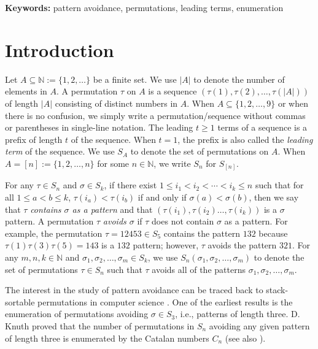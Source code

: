 \documentclass[11pt]{article}
\theoremstyle{definition}
\numberwithin{equation}{section}
\begin{document}
{\small \textbf{Keywords:} pattern avoidance, permutations, leading terms, enumeration} \\

\section{Introduction}
Let $A\subseteq\mathbb{N}:=\{1,2,\ldots\}$ be a finite set. We use $|A|$ to denote the number of elements in $A$. A permutation $\tau$ on $A$ is a sequence $(\tau(1),\tau(2),\ldots,\tau(|A|))$ of length $|A|$ consisting of distinct numbers in $A$. 
 When $A\subseteq\{1,2,\ldots,9\}$ or when there is no confusion, we 
simply write a permutation/sequence without commas or 
parentheses in single-line notation. The leading $t\geq 1$ terms of a 
sequence is a prefix of length $t$ 
of the sequence.
When $t=1$, the prefix is also called the \textit{leading term} of the sequence.
We use $S_A$ to denote the set of permutations on $A$. When $A=[n]:=\{1,2,\ldots,n\}$ for some $n\in\mathbb{N}$, we 
write $S_n$ for $S_{[n]}$.

For any $\tau\in S_n$ and $\sigma\in S_k$, if there exist $1\leq i_1<i_2<\cdots<i_k\leq n$ such that for all $1\leq a<b\leq k$, $\tau(i_a)<\tau(i_b)$ if and only if $\sigma(a)<\sigma(b)$, 
then we say that $\tau$ \textit{contains $\sigma$ as a pattern} and 
that $(\tau(i_1),\tau(i_2)\ldots,\tau(i_k))$ is a $\sigma$ pattern.
A permutation
$\tau$ \textit{avoids $\sigma$} if $\tau$ does not contain $\sigma$ as a pattern. For example, the permutation $\tau=12453\in S_5$ contains the pattern $132$ because $\tau(1)\tau(3)\tau(5)=143$ is a $132$ pattern; however, $\tau$ avoids the pattern $321$. 
For any $m,n,k\in\mathbb{N}$ and $\sigma_1,\sigma_2,\ldots,\sigma_m\in S_k$, we use $S_n(\sigma_1,\sigma_2,\ldots,\sigma_m)$ to denote the set of permutations $\tau\in S_n$ such that $\tau$ avoids 
all of the patterns $\sigma_1,\sigma_2,\ldots,\sigma_m$. 

The interest in the study of 
pattern avoidance can be traced back to 
stack-sortable permutations in computer science \cite[Section 2.1]{Kitaev2011}. 
One of the earliest results is the enumeration of permutations avoiding $\sigma\in S_3$, 
i.e., patterns of length three. D. Knuth \cite{Knuth1973} proved that the number 
of permutations in $S_n$ avoiding any given pattern of length three is 
enumerated by the Catalan numbers $C_n$
(see also \cite[Theorem 4.7]{Bona2022}).
\end{document}
